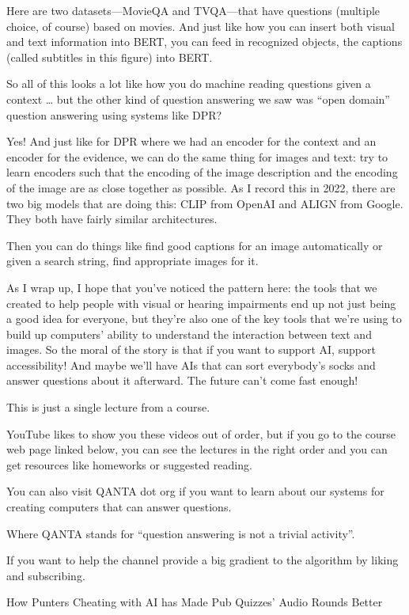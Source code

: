 Here are two datasets—MovieQA and TVQA—that have questions (multiple choice, of course) based on movies.  And just like how you can insert both visual and text information into BERT, you can feed in recognized objects, the captions (called subtitles in this figure) into BERT.

So all of this looks a lot like how you do machine reading questions given a context … but the other kind of question answering we saw was “open domain” question answering using systems like DPR?  

Yes!  And just like for DPR where we had an encoder for the context and an encoder for the evidence, we can do the same thing for images and text: try to learn encoders such that the encoding of the image description and the encoding of the image are as close together as possible.  As I record this in 2022, there are two big models that are doing this: CLIP from OpenAI and ALIGN from Google.  They both have fairly similar architectures.

Then you can do things like find good captions for an image automatically or given a search string, find appropriate images for it.

As I wrap up, I hope that you’ve noticed the pattern here: the tools that we created to help people with visual or hearing impairments end up not just being a good idea for everyone, but they’re also one of the key tools that we’re using to build up computers’ ability to understand the interaction between text and images.  So the moral of the story is that if you want to support AI, support accessibility!  And maybe we’ll have AIs that can sort everybody’s socks and answer questions about it afterward.  The future can’t come fast enough!

This is just a single lecture from a course.

YouTube likes to show you these videos out of order, but if you go to the course web page linked below, you can see the lectures in the right order and you can get resources like homeworks or suggested reading.

You can also visit QANTA dot org
if you want to learn about our systems for creating computers that can answer questions.

Where QANTA stands for “question answering is not a trivial activity”.

If you want to help the channel provide a big gradient to the algorithm by liking and subscribing.


How Punters Cheating with AI has Made Pub Quizzes' Audio Rounds Better

